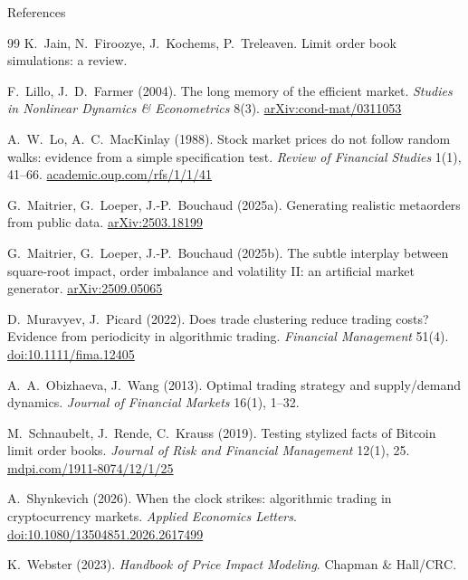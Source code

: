 \documentclass[aspectratio=169,10pt]{beamer}
\begin{document}
\begin{frame}[allowframebreaks]{References}
\begin{thebibliography}{99}
K.~Jain, N.~Firoozye, J.~Kochems, P.~Treleaven.
\newblock Limit order book simulations: a review.

F.~Lillo, J.~D.~Farmer (2004).
\newblock The long memory of the efficient market.
\newblock \emph{Studies in Nonlinear Dynamics \& Econometrics} 8(3).
\newblock \href{https://arxiv.org/abs/cond-mat/0311053}{arXiv:cond-mat/0311053}

A.~W.~Lo, A.~C.~MacKinlay (1988).
\newblock Stock market prices do not follow random walks: evidence from a simple specification test.
\newblock \emph{Review of Financial Studies} 1(1), 41--66.
\newblock \href{https://academic.oup.com/rfs/article/1/1/41/1601244}{academic.oup.com/rfs/1/1/41}

G.~Maitrier, G.~Loeper, J.-P.~Bouchaud (2025a).
\newblock Generating realistic metaorders from public data.
\newblock \href{https://arxiv.org/abs/2503.18199}{arXiv:2503.18199}

G.~Maitrier, G.~Loeper, J.-P.~Bouchaud (2025b).
\newblock The subtle interplay between square-root impact, order imbalance and volatility II:
an artificial market generator.
\newblock \href{https://arxiv.org/abs/2509.05065}{arXiv:2509.05065}

D.~Muravyev, J.~Picard (2022).
\newblock Does trade clustering reduce trading costs? Evidence from periodicity in algorithmic trading.
\newblock \emph{Financial Management} 51(4).
\newblock \href{https://onlinelibrary.wiley.com/doi/10.1111/fima.12405}{doi:10.1111/fima.12405}

A.~A.~Obizhaeva, J.~Wang (2013).
\newblock Optimal trading strategy and supply/demand dynamics.
\newblock \emph{Journal of Financial Markets} 16(1), 1--32.

M.~Schnaubelt, J.~Rende, C.~Krauss (2019).
\newblock Testing stylized facts of Bitcoin limit order books.
\newblock \emph{Journal of Risk and Financial Management} 12(1), 25.
\newblock \href{https://www.mdpi.com/1911-8074/12/1/25}{mdpi.com/1911-8074/12/1/25}

A.~Shynkevich (2026).
\newblock When the clock strikes: algorithmic trading in cryptocurrency markets.
\newblock \emph{Applied Economics Letters}.
\newblock \href{https://www.tandfonline.com/doi/full/10.1080/13504851.2026.2617499}{doi:10.1080/13504851.2026.2617499}

K.~Webster (2023).
\newblock \emph{Handbook of Price Impact Modeling}.
\newblock Chapman \& Hall/CRC.

\end{thebibliography}
\end{frame}
\end{document}
